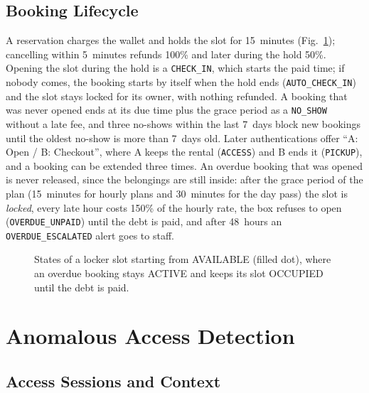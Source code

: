 \subsection{Booking Lifecycle}

A reservation charges the wallet and holds the slot for 15~minutes (Fig.~\ref{fig:state}); cancelling within
5~minutes refunds 100\% and later during the hold 50\%. Opening the slot during the hold is a \texttt{CHECK\_IN}, which
starts the paid time; if nobody comes, the booking starts by itself when the hold ends (\texttt{AUTO\_CHECK\_IN}) and
the slot stays locked for its owner, with nothing refunded. A booking that was never opened ends at its due time plus
the grace period as a \texttt{NO\_SHOW} without a late fee, and three no-shows within the last 7~days block new bookings
until the oldest no-show is more than 7~days old. Later authentications offer ``A: Open / B: Checkout'', where A keeps the
rental (\texttt{ACCESS}) and B ends it (\texttt{PICKUP}), and a booking can be extended three times. An overdue booking
that was opened is never released, since the belongings are still inside: after the grace period of the plan (15~minutes
for hourly plans and 30~minutes for the day pass) the slot is \emph{locked}, every late hour costs 150\% of the hourly rate,
the box refuses to open (\texttt{OVERDUE\_UNPAID}) until the debt is paid, and after 48~hours an \texttt{OVERDUE\_ESCALATED}
alert goes to staff.

\begin{figure}[!htbp]
\centering

\caption{States of a locker slot starting from AVAILABLE (filled dot), where an overdue booking stays ACTIVE and keeps
its slot OCCUPIED until the debt is paid.}
\label{fig:state}
\end{figure}

\section{Anomalous Access Detection}

\subsection{Access Sessions and Context}

